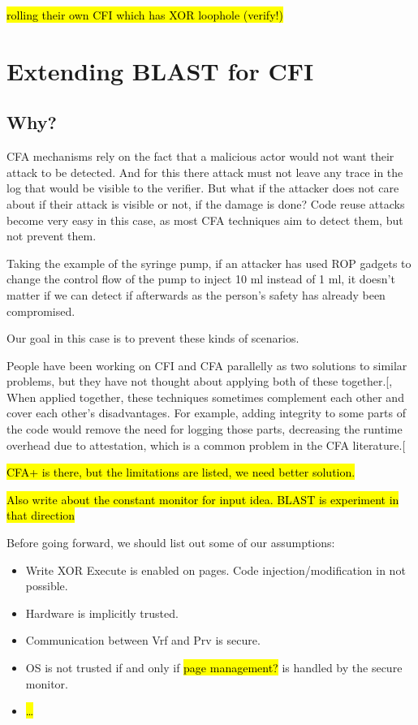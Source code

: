 \documentclass[a4paper, nobind]{templates/ociamthesis}
\providecommand{\tightlist}{%
  \setlength{\itemsep}{0pt}\setlength{\parskip}{0pt}}
\begin{document}
\hl{rolling their own CFI which has XOR loophole (verify!)}

\chapter{Extending BLAST for CFI}\label{extending-blast-for-cfi}

\minitoc 

\section{Why?}\label{why-1}

CFA mechanisms rely on the fact that a malicious actor would not want their attack
to be detected. And for this there attack must not leave any trace in the log that
would be visible to the verifier. But what if the attacker does not care about if
their attack is visible or not, if the damage is done? Code reuse attacks become
very easy in this case, as most CFA techniques aim to detect them, but not prevent them.

Taking the example of the syringe pump, if an attacker has used ROP gadgets to
change the control flow of the pump to inject 10 ml instead of 1 ml, it doesn't
matter if we can detect if afterwards as the person's safety has already been compromised.

Our goal in this case is to prevent these kinds of scenarios.

People have been working on CFI and CFA parallelly as two solutions to similar
problems, but they have not thought about applying both of these together.{[}, \citeproc{ref-sok}{2}{]}
When applied together, these techniques sometimes complement each other and cover
each other's disadvantages. For example, adding integrity to some parts of the
code would remove the need for logging those parts, decreasing the runtime overhead
due to attestation, which is a common problem in the CFA literature.{[}\citeproc{ref-sok}{2}{]}

\hl{CFA+ is there, but the limitations are listed, we need better solution.}

\hl{Also write about the constant monitor for input idea. BLAST is experiment in that direction}

Before going forward, we should list out some of our assumptions:

\begin{itemize}
\tightlist
\item
  Write XOR Execute is enabled on pages. Code injection/modification in not possible.
\item
  Hardware is implicitly trusted.
\item
  Communication between Vrf and Prv is secure.
\item
  OS is not trusted if and only if \hl{page management?} is handled
  by the secure monitor.
\item
  \hl{\ldots{}}
\end{itemize}
\end{document}
